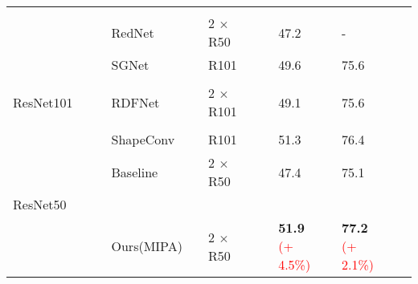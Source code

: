 \documentclass{aims}
\numberwithin{equation}{section}
\begin{document}
\begin{table}[!htb]
\begin{tabular}{lllllllllllll}
          &       &       &       &       &       &       &       &       &       &       &         \\
          &       &       & RedNet\cite{jiang2018rednet} &       &        2 $\times$  R50 &       &       & 47.2  &       &        - \\
    \midrule
          &       &       & SGNet\cite{chen2021spatial} &       &        R101  &       &       & 49.6  &       &        75.6 \\
          &       &       &       &       &       &       &       &       &       &       &         \\
    ResNet101 &       &       & RDFNet &       &        2 $\times$  R101 &       &       & 49.1  &       &       75.6 \\
          &       &       &       &       &       &       &       &       &       &       &         \\
          &       &       & ShapeConv\cite{cao2021shapeconv} &       &        R101  &       &       & 51.3  &       &        76.4 \\
    \midrule
          &       &       & Baseline &       &        2 $\times$  R50 &       &       & 47.4  &       &        75.1 \\
    ResNet50 &       &       &       &       &       &       &       &       &       &       &         \\
          &       &       & Ours(MIPA) &       &        2 $\times$  R50 &       &       & \textbf{51.9} \textcolor{red}{(+ 4.5\%)}&       &        \textbf{77.2} \textcolor{red}{(+ 2.1\%)} \\
    \bottomrule
    \end{tabular}\label{tab:1}\end{table}
\end{document}
